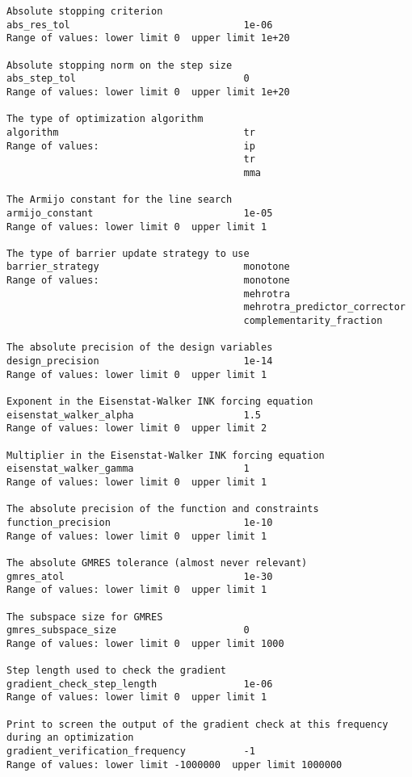 \documentclass[12pt]{article}
\begin{document}
{\footnotesize
\begin{verbatim}
Absolute stopping criterion
abs_res_tol                              1e-06
Range of values: lower limit 0  upper limit 1e+20

Absolute stopping norm on the step size
abs_step_tol                             0
Range of values: lower limit 0  upper limit 1e+20

The type of optimization algorithm
algorithm                                tr
Range of values:                         ip
                                         tr
                                         mma

The Armijo constant for the line search
armijo_constant                          1e-05
Range of values: lower limit 0  upper limit 1

The type of barrier update strategy to use
barrier_strategy                         monotone
Range of values:                         monotone
                                         mehrotra
                                         mehrotra_predictor_corrector
                                         complementarity_fraction

The absolute precision of the design variables
design_precision                         1e-14
Range of values: lower limit 0  upper limit 1

Exponent in the Eisenstat-Walker INK forcing equation
eisenstat_walker_alpha                   1.5
Range of values: lower limit 0  upper limit 2

Multiplier in the Eisenstat-Walker INK forcing equation
eisenstat_walker_gamma                   1
Range of values: lower limit 0  upper limit 1

The absolute precision of the function and constraints
function_precision                       1e-10
Range of values: lower limit 0  upper limit 1

The absolute GMRES tolerance (almost never relevant)
gmres_atol                               1e-30
Range of values: lower limit 0  upper limit 1

The subspace size for GMRES
gmres_subspace_size                      0
Range of values: lower limit 0  upper limit 1000

Step length used to check the gradient
gradient_check_step_length               1e-06
Range of values: lower limit 0  upper limit 1

Print to screen the output of the gradient check at this frequency during an optimization
gradient_verification_frequency          -1
Range of values: lower limit -1000000  upper limit 1000000


\end{verbatim}}
\end{document}

